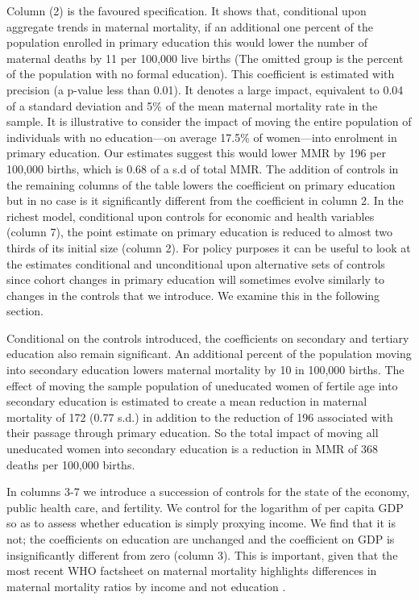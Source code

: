 \documentclass{article}[12pt,subeqn]
\begin{document}
\begin{spacing}{1.4}
Column (2) is the favoured specification. It shows that, conditional upon aggregate trends in maternal
mortality, if an additional one percent of the population enrolled in primary education this would lower
the number of maternal deaths by 11 per 100,000 live births (The omitted group is the percent of the
population with no formal education). This coefficient is estimated with precision (a p-value less than 0.01).
It denotes a large impact, equivalent to 0.04 of a standard deviation and 5\% of the mean maternal mortality
rate in the sample. It is illustrative to consider the impact of moving the entire population of individuals
with no education---on average 17.5\% of women---into enrolment in primary education. Our estimates
suggest this would lower MMR by 196 per 100,000 births, which is 0.68 of a s.d of total MMR. The addition
of controls in the remaining columns of the table lowers the coefficient on primary education but in no case
is it significantly different from the coefficient in column 2. In the richest model, conditional upon controls
for economic and health variables (column 7), the point estimate on primary education is reduced to
almost two thirds of its initial size (column 2). For policy purposes it can be useful to look at the estimates
conditional and unconditional upon alternative sets of controls since cohort changes in primary education
will sometimes evolve similarly to changes in the controls that we introduce. We examine this in the
following section.

Conditional on the controls introduced, the coefficients on secondary and tertiary education also remain
significant. An additional percent of the population moving into secondary education lowers maternal
mortality by 10 in 100,000 births. The effect of moving the sample population of uneducated women of
fertile age into secondary education is estimated to create a mean reduction in maternal mortality of 172
(0.77 s.d.) in addition to the reduction of 196 associated with their passage through primary education. So
the total impact of moving all uneducated women into secondary education is a reduction in MMR of 368
deaths per 100,000 births.

In columns 3-7 we introduce a succession of controls for the state of the economy, public health care,
and fertility. We control for the logarithm of per capita GDP so as to assess whether education is simply
proxying income. We find that it is not; the coefficients on education are unchanged and the coefficient on
GDP is insignificantly different from zero (column 3). This is important, given that the most recent WHO 
factsheet on maternal mortality highlights differences in maternal mortality ratios by income and not education 
\citep{WHO2012}.


\end{spacing}
\end{document}
